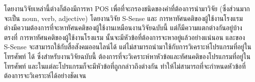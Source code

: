 โดยงานวิจัยเหล่านี้ต่างก็ต้องมีการหา POS เพื่อที่จะกรองชนิดของคำที่ต้องการนำมาวิจัย (ซึ่งส่วนมากจะเป็น noun, verb, adjective) โดยงานวิจัย S-Sense และ การหาทัศนคติของผู้ใช้งานโรงแรม ต่างมีความต้องการที่จะหาทัศนคติของผู้ใช้งานเหมือนงานวิจัยฉบับนี้ แต่ก็มีความแตกต่างกันอยู่บ้างตรงที่ การหาทัศนคติของผู้ใช้งานโรงแรม นั้นจะมีหัวข้อที่ต้องการจะหาอยู่แล้วอย่างแน่นอน และของ S-Sense จะสามารถใช้กับสื่อสังคมออนไลน์ได้ แต่ไม่สามารถนำมาใช้กับการวิเคราะห์โปรแกรมที่อยู่ในโทรศัพท์ ได้
ซึ่งสำหรับงานวิจัยฉบับนี้ ต้องการที่จะวิเคราะห์หาหัวข้อและทัศนคติของโปรแกรมที่อยู่ในโทรศัพท์ และในแต่ละโปรแกรมก็จะมีหัวข้อที่ถูกกล่าวถึงต่างกัน ทำให้ไม่สามารถที่จะกำหนดหัวข้อที่ต้องการจะวิเคราะห์ได้อย่างชัดเจน

